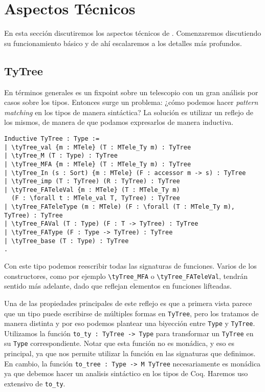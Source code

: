 \chapter{Aspectos Técnicos}\label{ch:technical}

En esta sección discutiremos los aspectos técnicos de \lift.
Comenzaremos discutiendo su funcionamiento básico y de ahí escalaremos a los detalles más profundos. 

\section{TyTree}

En términos generales \lift es un fixpoint sobre un telescopio con un gran análisis por casos sobre los tipos.
Entonces surge un problema: ¿cómo podemos hacer \textit{pattern matching} en los tipos de manera sintáctica?
La solución es utilizar un reflejo de los mismos, de manera de que podamos expresarlos de manera inductiva.

\begin{lstlisting}
Inductive TyTree : Type :=
| \tyTree_val {m : MTele} (T : MTele_Ty m) : TyTree
| \tyTree_M (T : Type) : TyTree
| \tyTree_MFA {m : MTele} (T : MTele_Ty m) : TyTree
| \tyTree_In (s : Sort) {m : MTele} (F : accessor m -> s) : TyTree
| \tyTree_imp (T : TyTree) (R : TyTree) : TyTree
| \tyTree_FATeleVal {m : MTele} (T : MTele_Ty m)
  (F : \forall t : MTele_val T, TyTree) : TyTree
| \tyTree_FATeleType (m : MTele) (F : \forall (T : MTele_Ty m), TyTree) : TyTree
| \tyTree_FAVal (T : Type) (F : T -> TyTree) : TyTree
| \tyTree_FAType (F : Type -> TyTree) : TyTree
| \tyTree_base (T : Type) : TyTree
.
\end{lstlisting}

Con este tipo podemos reescribir todas las signaturas de funciones. Varios de los constructores, como por ejemplo
\lstinline{\tyTree_MFA} o \lstinline{\tyTree_FATeleVal}, tendrán sentido más adelante, dado que reflejan elementos en
funciones lifteadas.

Una de las propiedades principales de este reflejo es que a primera vista parece que un tipo puede escribirse de múltiples formas en \lstinline{TyTree}, pero los tratamos de manera distinta y por eso podemos plantear una biyección
entre \lstinline{Type} y \lstinline{TyTree}. Utilizamos la función \lstinline{to_ty : TyTree -> Type} para transformar un \lstinline{TyTree} en su \lstinline{Type} correspondiente. Notar que esta función no es monádica, y eso es principal, ya que nos permite utilizar la función en las signaturas que definimos. En cambio, la función \lstinline{to_tree : Type -> M TyTree} necesariamente es monádica ya que debemos hacer un analisis sintáctico en los tipos de Coq. Haremos uso extensivo de \lstinline{to_ty}.

